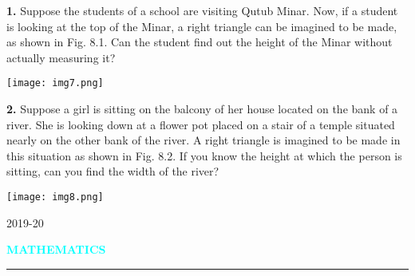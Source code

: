 \documentclass[11pt,a4paper]{article}
\begin{document}
\vspace{1em}

\noindent
\begin{minipage}[t]{0.6\textwidth}
\raggedright
\vspace{-5cm}
\textbf{1.} Suppose the students of a school are visiting Qutub Minar. Now, if a student is looking at the top of the Minar, a right triangle can be imagined to be made, as shown in Fig. 8.1. Can the student find out the height of the Minar without actually measuring it?
\end{minipage}%
\hfill
\begin{minipage}[t]{0.35\textwidth}
\centering
\texttt{[image: img7.png]}\\
\end{minipage}

\vspace{2em}

\noindent
\begin{minipage}[t]{0.6\textwidth}
\raggedright
\vspace{-5cm}
\textbf{2.} Suppose a girl is sitting on the balcony of her house located on the bank of a river. She is looking down at a flower pot placed on a stair of a temple situated nearly on the other bank of the river. A right triangle is imagined to be made in this situation as shown in Fig. 8.2. If you know the height at which the person is sitting, can you find the width of the river?
\end{minipage}%
\hfill
\begin{minipage}[t]{0.35\textwidth}
\centering
\texttt{[image: img8.png]}\\
\end{minipage}
\vspace{2em}
\begin{center}
2019-20
\end{center}
\pagestyle{empty}
\color{textcolor}

\vspace*{5em}
\begin{flushright}
    \textbf{\textsf{\textcolor{cyan}{MATHEMATICS}}}

\end{flushright}
\vspace{-0.2cm}
\noindent\textcolor{cyan}{\rule{\textwidth}{1pt}}


\vspace{1em}
\end{document}
